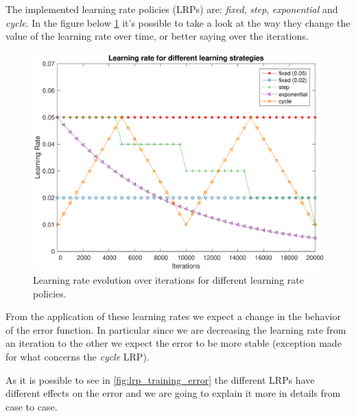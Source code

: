 The implemented learning rate policies (LRPs) are: \textit{fixed}, \textit{step}, \textit{exponential} and \textit{cycle}.
In the figure below \cref{fig:learning_rates_policies} it's possible to take a look at the way they change the value of the learning rate over time,
or better saying over the iterations.

\begin{figure}
	\centering
	\includegraphics[width=\columnwidth]{figures/learning_rates}
	\caption{Learning rate evolution over iterations for different learning rate policies.}
	\label{fig:learning_rates_policies}
\end{figure}

From the application of these learning rates we expect a change in the behavior of the error function. In particular
since we are decreasing the learning rate from an iteration to the other we expect the error to be more stable (exception made
for what concerns the \textit{cycle} LRP).

As it is possible to see in \cref{fig:lrp_training_error} the different LRPs have different
effects on the error and we are going to explain it more in details from case to case.

